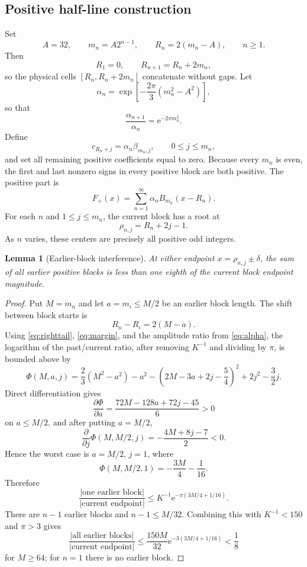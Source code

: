 \documentclass[11pt]{article}
\newtheorem{lemma}[theorem]{Lemma}
\newcommand{\e}{\mathrm{e}}
\begin{document}
\subsection{Positive half-line construction}
Set
\[
 A=32,\qquad m_n=A2^{n-1},\qquad R_n=2(m_n-A),\qquad n\ge1.
\]
Then
\[
 R_1=0,\qquad R_{n+1}=R_n+2m_n,
\]
so the physical cells $[R_n,R_n+2m_n]$ concatenate without gaps. Let
\begin{equation}\label{eq:alpha}
 \alpha_n=
 \exp\!\left[-\frac{2\pi}{3}(m_n^2-A^2)\right],
\end{equation}
so that
\begin{equation}\label{eq:alpha-ratio}
 \frac{\alpha_{n+1}}{\alpha_n}=\e^{-2\pi m_n^2}.
\end{equation}
Define
\begin{equation}\label{eq:positive-c}
 c_{R_n+j}=\alpha_n\beta_{m_n,j},\qquad 0\le j\le m_n,
\end{equation}
and set all remaining positive coefficients equal to zero. Because every $m_n$ is even, the first and last nonzero signs in every positive block are both positive. The positive part is
\[
 F_+(x)=\sum_{n=1}^{\infty}\alpha_nB_{m_n}(x-R_n).
\]
For each $n$ and $1\le j\le m_n$, the current block has a root at
\[
 \rho_{n,j}=R_n+2j-1.
\]
As $n$ varies, these centers are precisely all positive odd integers.

\begin{lemma}[Earlier-block interference]\label{lem:earlier}
At either endpoint $x=\rho_{n,j}\pm\delta$, the sum of all earlier positive blocks is less than one eighth of the current block endpoint magnitude.
\end{lemma}

\begin{proof}
Put $M=m_n$ and let $a=m_i\le M/2$ be an earlier block length. The shift between block starts is
\[
 R_n-R_i=2(M-a).
\]
Using \eqref{eq:righttail}, \eqref{eq:margin}, and the amplitude ratio from \eqref{eq:alpha}, the logarithm of the past/current ratio, after removing $K^{-1}$ and dividing by $\pi$, is bounded above by
\[
 \Phi(M,a,j)=\frac23(M^2-a^2)-a^2-
 \left(2M-3a+2j-\frac54\right)^2
 +2j^2-\frac32j.
\]
Direct differentiation gives
\[
 \frac{\partial\Phi}{\partial a}
 =\frac{72M-128a+72j-45}{6}>0
\]
on $a\le M/2$, and after putting $a=M/2$,
\[
 \frac{\partial}{\partial j}\Phi(M,M/2,j)
 =-\frac{4M+8j-7}{2}<0.
\]
Hence the worst case is $a=M/2$, $j=1$, where
\[
 \Phi(M,M/2,1)=-\frac{3M}{4}-\frac1{16}.
\]
Therefore
\[
 \frac{|\text{one earlier block}|}{|\text{current endpoint}|}
 \le K^{-1}\e^{-\pi(3M/4+1/16)}.
\]
There are $n-1$ earlier blocks and $n-1\le M/32$. Combining this with $K^{-1}<150$ and $\pi>3$ gives
\[
 \frac{|\text{all earlier blocks}|}{|\text{current endpoint}|}
 \le \frac{150M}{32}\e^{-3(3M/4+1/16)}<\frac18
\]
for $M\ge64$; for $n=1$ there is no earlier block.
\end{proof}
\end{document}

